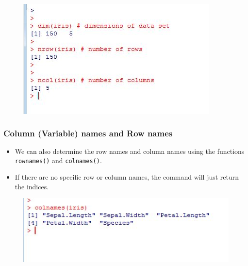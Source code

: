 \documentclass{beamer}
\begin{document}
 	\begin{frame}
 		\begin{figure}
 			\centering
 			\includegraphics[width=1.2\linewidth]{images/dimsiris}
 		\end{figure}
 		
 		
 		
 	\end{frame}
 	\begin{frame}
 		\frametitle{Column (Variable) names and Row names}
 		\begin{itemize}
 			\item We can also determine the row names and column names using the functions \texttt{rownames()}
 			and \texttt{colnames()}. 
 			\item If there are no specific row or column names, the command will just return
 			the indices.
 		\end{itemize}
 		\begin{figure}
 			\centering
 			\includegraphics[width=1.2\linewidth]{images/colnamesiris}
 		\end{figure}
 		
 	\end{frame}
\end{document}
